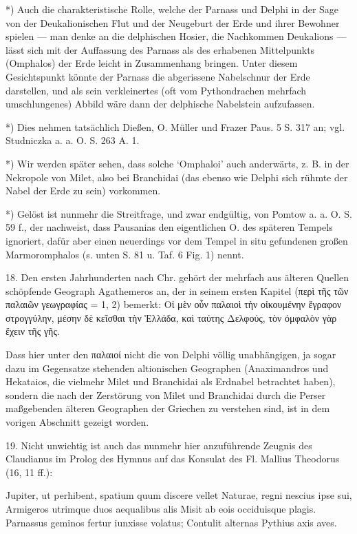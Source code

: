 \documentclass[a4paper, 11pt, oneside]{article}
\begin{document}
*) Auch die charakteristische Rolle, welche der Parnass und Delphi in der Sage von der Deukalionischen Flut und der Neugeburt der Erde und ihrer Bewohner spielen --- man denke an die delphischen Hosier, die Nachkommen Deukalions --- lässt sich mit der Auffassung des Parnass als des erhabenen Mittelpunkts (Omphalos) der Erde leicht in Zusammenhang bringen. Unter diesem Gesichtspunkt könnte der Parnass die abgerissene Nabelschnur der Erde darstellen, und als sein verkleinertes (oft vom Pythondrachen mehrfach umschlungenes) Abbild wäre dann der delphische Nabelstein aufzufassen.

*) Dies nehmen tatsächlich Dießen, O. Müller und Frazer Paus. 5 S. 317 an; vgl. Studniczka a. a. O. S. 263 A. 1.

*) Wir werden später sehen, dass solche `Omphaloi' auch anderwärts, z. B. in der Nekropole von Milet, also bei Branchidai (das ebenso wie Delphi sich rühmte der Nabel der Erde zu sein) vorkommen.

*) Gelöst ist nunmehr die Streitfrage, und zwar endgültig, von Pomtow a. a. O. S. 59 f., der nachweist, dass Pausanias den eigentlichen O. des späteren Tempels ignoriert, dafür aber einen neuerdings vor dem Tempel in situ gefundenen großen Marmoromphalos (s. unten S. 81 u. Taf. 6 Fig. 1) nennt.

18. Den ersten Jahrhunderten nach Chr. gehört der mehrfach aus älteren Quellen schöpfende Geograph Agathemeros an, der in seinem ersten Kapitel (περὶ τῆς τῶν παλαιῶν γεωγραφίας = 1, 2) bemerkt: Οἱ μὲν οὖν παλαιοὶ τὴν οἰκουμένην ἔγραφον στρογγύλην, μέσην δὲ κεῖσθαι τὴν Ἑλλάδα, καὶ ταύτης Δελφούς, τὸν ὀμφαλὸν γὰρ ἔχειν τῆς γῆς.

Dass hier unter den παλαιοί nicht die von Delphi völlig unabhängigen, ja sogar dazu im Gegensatze stehenden altionischen Geographen (Anaximandros und Hekataios, die vielmehr Milet und Branchidai als Erdnabel betrachtet haben), sondern die nach der Zerstörung von Milet und Branchidai durch die Perser maßgebenden älteren Geographen der Griechen zu verstehen sind, ist in dem vorigen Abschnitt gezeigt worden.

19. Nicht unwichtig ist auch das nunmehr hier anzuführende Zeugnis des Claudianus im Prolog des Hymnus auf das Konsulat des Fl. Mallius Theodorus (16, 11 ff.):

Jupiter, ut perhibent, spatium quum discere vellet  Naturae, regni nescius ipse sui,  Armigeros utrimque duos aequalibus alis  Misit ab eois occiduisque plagis.  Parnassus geminos fertur iunxisse volatus;  Contulit alternas Pythius axis aves.
\end{document}
